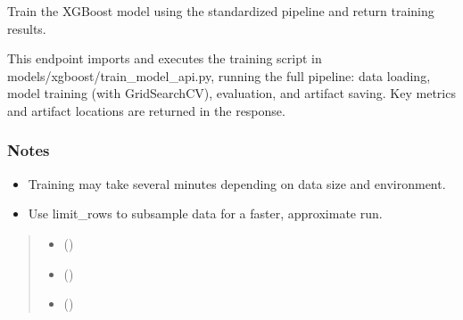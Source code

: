 \documentclass[letterpaper,10pt,english]{sphinxmanual}
\begin{document}
\begin{fulllineitems}
\label{\detokenize{api_reference:app.routers.predictions.train_xgboost_model_endpoint}}
\pysigstartsignatures
\pysiglinewithargsret
{}
{\sphinxparamcomma {}\sphinxparamcomma {}}
{}
\pysigstopsignatures
\sphinxAtStartPar
Train the XGBoost model using the standardized pipeline and return training results.

\sphinxAtStartPar
This endpoint imports and executes the training script in models/xgboost/train\_model\_api.py,
running the full pipeline: data loading, model training (with GridSearchCV), evaluation, and artifact saving.
Key metrics and artifact locations are returned in the response.
\subsubsection*{Notes}
\begin{itemize}
\item {} 
\sphinxAtStartPar
Training may take several minutes depending on data size and environment.

\item {} 
\sphinxAtStartPar
Use limit\_rows to subsample data for a faster, approximate run.

\end{itemize}
\begin{quote}\begin{description}
\begin{itemize}
\item {} 
\sphinxAtStartPar
{} ()

\item {} 
\sphinxAtStartPar
{} ()

\item {} 
\sphinxAtStartPar
{} ()

\end{itemize}

\end{description}\end{quote}

\end{fulllineitems}
\end{document}
